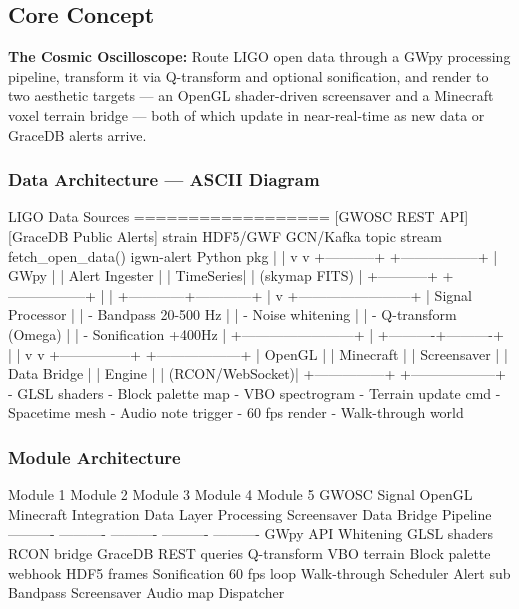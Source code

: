 \documentclass[11pt,letterpaper]{article}
\begin{document}
\subsection{Core Concept}

\textbf{The Cosmic Oscilloscope:} Route LIGO open data through a GWpy processing pipeline, transform it via Q-transform and optional sonification, and render to two aesthetic targets --- an OpenGL shader-driven screensaver and a Minecraft voxel terrain bridge --- both of which update in near-real-time as new data or GraceDB alerts arrive.

\subsubsection{Data Architecture --- ASCII Diagram}

\begin{asciibox}
LIGO Data Sources
==================
 [GWOSC REST API]         [GraceDB Public Alerts]
  strain HDF5/GWF          GCN/Kafka topic stream
  fetch_open_data()         igwn-alert Python pkg
        |                         |
        v                         v
  +-----------+          +-----------------+
  |  GWpy     |          |  Alert Ingester  |
  |  TimeSeries|          |  (skymap FITS)  |
  +-----------+          +-----------------+
        |                         |
        +------------+------------+
                     |
                     v
         +------------------------+
         |  Signal Processor      |
         |  - Bandpass 20-500 Hz  |
         |  - Noise whitening     |
         |  - Q-transform (Omega) |
         |  - Sonification +400Hz |
         +------------------------+
                     |
          +----------+----------+
          |                     |
          v                     v
  +---------------+    +------------------+
  |  OpenGL       |    |  Minecraft       |
  |  Screensaver  |    |  Data Bridge     |
  |  Engine       |    |  (RCON/WebSocket)|
  +---------------+    +------------------+
  - GLSL shaders        - Block palette map
  - VBO spectrogram     - Terrain update cmd
  - Spacetime mesh      - Audio note trigger
  - 60 fps render       - Walk-through world
\end{asciibox}

\subsubsection{Module Architecture}

\begin{asciibox}
 Module 1       Module 2          Module 3        Module 4       Module 5
 GWOSC          Signal            OpenGL          Minecraft      Integration
 Data Layer     Processing        Screensaver     Data Bridge    Pipeline
 ----------     ----------        ----------      ----------     ----------
 GWpy API       Whitening         GLSL shaders    RCON bridge    GraceDB
 REST queries   Q-transform       VBO terrain     Block palette  webhook
 HDF5 frames   Sonification      60 fps loop      Walk-through   Scheduler
 Alert sub      Bandpass          Screensaver      Audio map      Dispatcher
\end{asciibox}
\end{document}
